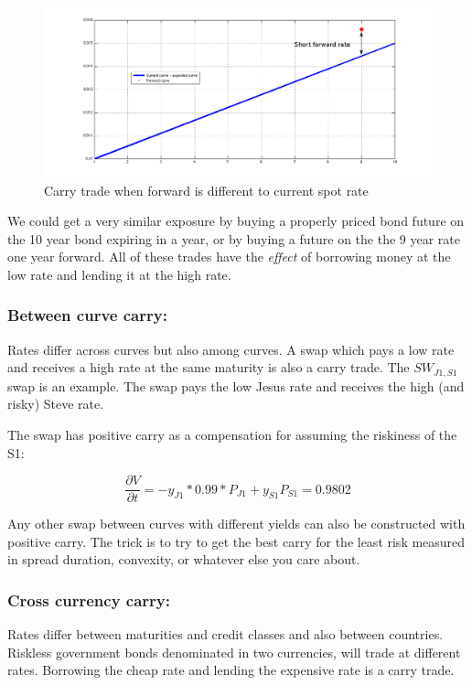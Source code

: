 \begin{figure}[ht]
\centering
  \includegraphics[width=5in] {pics/carry}
\caption{Carry trade when forward is different to current spot rate}
\label{fig:carry}
\end{figure}

We could get a very similar exposure by buying a properly priced bond future on the 10 year bond expiring in a year, or by buying a future on the the 9 year rate one year forward. All of these trades have the \textit{effect} of borrowing money at the low rate and lending it at the high rate.


\subsubsection*{Between curve carry:}

Rates differ across curves but also among curves.  A swap which pays a low rate and receives a high rate at the same maturity is also a carry trade. The $SW_{J1,S1}$ swap is an example. The swap pays the low Jesus rate and receives the high (and risky) Steve rate.

The swap has positive carry as a compensation for assuming the riskiness of the S1:

\[\frac{\partial V}{\partial t} = -y_{J1}*0.99*P_{J1}+y_{S1}P_{S1}= 0.9802 \]

Any other swap between curves with different yields can also be constructed with positive carry. The trick is to try to get the best carry for the least risk measured in spread duration, convexity, or whatever else you care about.


\subsubsection*{Cross currency carry:}

Rates differ between maturities and credit classes and also between countries. Riskless government bonds denominated in two currencies, will trade at different rates. Borrowing the cheap rate and lending the expensive rate is a carry trade.

